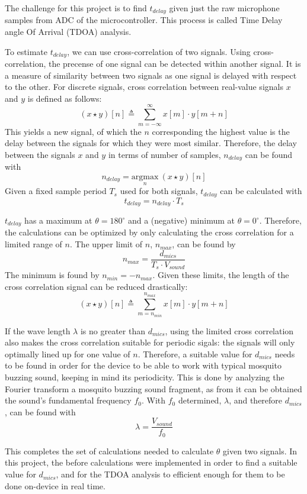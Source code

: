\documentclass[a4paper]{article}
\begin{document}
The challenge for this project is to find $t_{delay}$ given just the raw microphone samples from ADC of the microcontroller. This process is called Time Delay angle Of Arrival (TDOA) analysis.


To estimate $t_{delay}$, we can use cross-correlation of two signals. Using cross-correlation, the precense of one signal can be detected within another signal. It is a measure of similarity between two signals as one signal is delayed with respect to the other. For discrete signals, cross correlation between real-value signals $x$ and $y$ is defined as follows: \[(x \star y)[n] \triangleq \sum_{m = -\infty}^ {\infty} x[m]\cdot y[m + n]\] This yields a new signal, of which the $n$ corresponding the highest value is the delay between the signals for which they were most similar. Therefore, the delay between the signals $x$ and $y$ in terms of number of samples, $n_{delay}$ can be found with \[n_{delay} = \underset{n}{\mathrm{argmax}}\ (x \star y)[n]\] Given a fixed sample period $T_s$ used for both signals, $t_{delay}$ can be calculated with \[t_{delay} = n_{delay} \cdot T_s\]

$t_{delay}$ has a maximum at $\theta = 180^{\circ}$ and a (negative) minimum at $\theta = 0^{\circ}$. Therefore, the calculations can be optimized by only calculating the cross correlation for a limited range of $n$. The upper limit of $n$, $n_{max}$, can be found by \[n_{max} = \frac{d_{mics}}{T_s \cdot V_{sound}}\] The minimum is found by $n_{min} = -n_{max}$. Given these limits, the length of the cross correlation signal can be reduced drastically:\[(x \star y)[n] \triangleq \sum_{m = n_{min}}^ {n_{max}} x[m]\cdot y[m + n]\]

If the wave length $\lambda$ is no greater than $d_{mics}$, using the limited cross correlation also makes the cross correlation suitable for periodic sigals: the signals will only optimally lined up for one value of $n$. Therefore, a suitable value for $d_{mics}$ needs to be found in order for the device to be able to work with typical mosquito buzzing sound, keeping in mind its periodicity. This is done by analyzing the Fourier transform a mosquito buzzing sound fragment\cite{mosquito_fragment}, as from it can be obtained the sound's fundamental frequency $f_0$. With $f_0$ determined, $\lambda$, and therefore $d_{mics}$, can be found with \[\lambda = \frac{V_{sound}}{f_0}\]

This completes the set of calculations needed to calculate $\theta$ given two signals. In this project, the before calculations were implemented in order to find a suitable value for $d_{mics}$, and for the TDOA analysis to efficient enough for them to be done on-device in real time.
\end{document}
